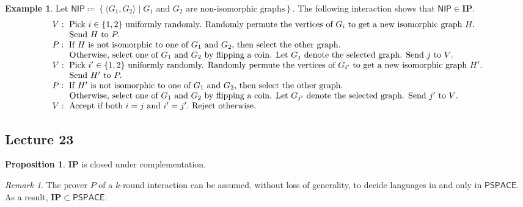 \documentclass[10pt,letterpaper,cm]{nupset}
\theoremstyle{definition}
\newtheorem{exmp}[definition]{Example}
\theoremstyle{theorem}
\newtheorem{prop}[definition]{Proposition}
\theoremstyle{remark}
\newtheorem{remark}[definition]{Remark}
\newcommand{\1}{\mathbf{1}}
\newcommand{\0}{\vec 0}
\begin{document}
\begin{exmp}
Let $\mathsf{NIP}\coloneqq \left\{ \langle G_1, G_2 \rangle \mid G_1 \text{ and }G_2 \text{ are non-isomorphic graphs}\right\}$. The following interaction shows that $\mathsf{NIP} \in \mathbf{IP}$.
\[
\begin{array}{l}{V : \text { Pick } i \in\{1,2\} \text { uniformly randomly. Randomly permute the vertices of } G_{i} \text { to get a  new isomorphic graph } H .} \\ {\text {\quad \quad Send } H \text { to } P .} \\ {P : \text { If } H \text { is not isomorphic to one of } G_1 \text{ and } G_2 \text {, then select the other graph. }} \\ {
\text {\quad \quad Otherwise, select one of } G_1 \text{ and } G_2 \text { by flipping a coin. Let } G_j \text{ denote the selected graph. Send } j \text { to } V \text {. }} \\
{V : \text { Pick } i' \in\{1,2\} \text { uniformly randomly. Randomly permute the vertices of } G_{i'} \text { to get a new isomorphic graph } H' .} \\ { \text {\quad \quad Send } H' \text { to } P .} \\ {P : \text { If } H' \text { is not isomorphic to one of } G_1 \text{ and } G_2 \text {, then select the other graph. }} \\ {
\text {\quad \quad Otherwise, select one of } G_1 \text{ and } G_2 \text { by flipping a coin. Let } G_{j'} \text{ denote the selected graph. Send } j' \text { to } V \text {. }}
\\ {V : \text { Accept if both } i=j \text{ and } i' =j'. \text { Reject otherwise. }}\end{array}
\] 
\end{exmp}

\subsection{Lecture 23}

\begin{prop}
$\mathbf{IP}$ is closed under complementation. 
\end{prop}

\begin{remark}
The prover $P$ of a $k$-round interaction can be assumed, without loss of generality, to decide languages in and only in $\mathsf{PSPACE}$. As a result, $\mathbf{IP} \subset \mathsf{PSPACE}$.
\end{remark}
\end{document}
